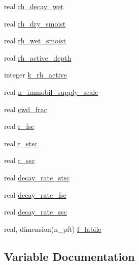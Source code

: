 \begin{DoxyCompactItemize}
\item 
real \hyperlink{namespacedecomp__coms_a49939319c35a32768b1106977d01b956}{rh\+\_\+decay\+\_\+wet}
\item 
real \hyperlink{namespacedecomp__coms_a376a5f59af3fff1df41ee2526e12d770}{rh\+\_\+dry\+\_\+smoist}
\item 
real \hyperlink{namespacedecomp__coms_a44a77512c0fb885ba9e4466402acd9c7}{rh\+\_\+wet\+\_\+smoist}
\item 
real \hyperlink{namespacedecomp__coms_a341e2649f9bd1e218c98505c0b7ce787}{rh\+\_\+active\+\_\+depth}
\item 
integer \hyperlink{namespacedecomp__coms_ad0a2f36f4bb43093696721e09df4a9e9}{k\+\_\+rh\+\_\+active}
\item 
real \hyperlink{namespacedecomp__coms_a75e582cc925b90448eed4ff7320fce15}{n\+\_\+immobil\+\_\+supply\+\_\+scale}
\item 
real \hyperlink{namespacedecomp__coms_a98eb32e300e06da7e5f6f8c75cdf1b01}{cwd\+\_\+frac}
\item 
real \hyperlink{namespacedecomp__coms_a0bef042050b97eeb7d14266674efd4fd}{r\+\_\+fsc}
\item 
real \hyperlink{namespacedecomp__coms_a632207b6b921ec9332d72826f6f92425}{r\+\_\+stsc}
\item 
real \hyperlink{namespacedecomp__coms_a039995e3414a2ec7fbabdb27f801425b}{r\+\_\+ssc}
\item 
real \hyperlink{namespacedecomp__coms_a6e61ed0b816c5e67c3163a235644aa5f}{decay\+\_\+rate\+\_\+stsc}
\item 
real \hyperlink{namespacedecomp__coms_afb3b626ea1538ffe9fda37c6be99fd2e}{decay\+\_\+rate\+\_\+fsc}
\item 
real \hyperlink{namespacedecomp__coms_a4f019556e7a13ea97a848a68f8aea865}{decay\+\_\+rate\+\_\+ssc}
\item 
real, dimension(n\+\_\+pft) \hyperlink{namespacedecomp__coms_a073b9f7c8ba7d2817a8b7fb32737d871}{f\+\_\+labile}
\end{DoxyCompactItemize}


\subsection{Variable Documentation}
\mbox{\label{namespacedecomp__coms_a98eb32e300e06da7e5f6f8c75cdf1b01}} 
